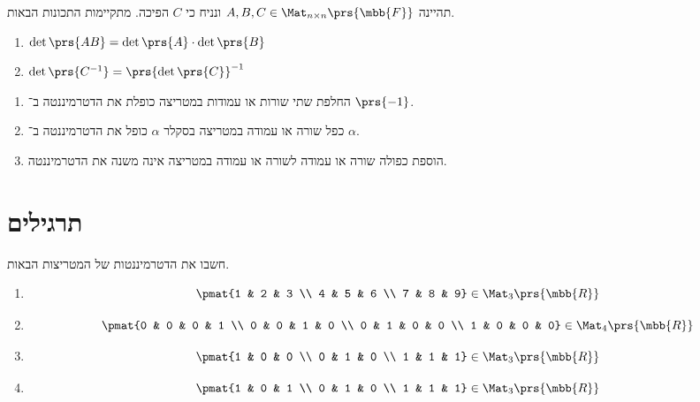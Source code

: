 \documentclass[a4paper,10pt,twoside,openany]{book}
\begin{document}
\begin{theorem}
תהיינה
$A, B, C \in \Mat_{n \times n}\prs{\mbb{F}}$
ונניח כי
$C$
הפיכה.
מתקיימות התכונות הבאות.
\begin{enumerate}
\item $\det\prs{AB} = \det\prs{A} \cdot \det\prs{B}$
\item $\det\prs{C^{-1}} = \prs{\det\prs{C}}^{-1}$
\end{enumerate}
\end{theorem}

\begin{theorem}
\begin{enumerate}
\item החלפת שתי שורות או עמודות במטריצה כופלת את הדטרמיננטה ב־%
$\prs{-1}$.
\item כפל שורה או עמודה במטריצה בסקלר
$\alpha$
כופל את הדטרמיננטה ב־%
$\alpha$.
\item הוספת כפולה שורה או עמודה לשורה או עמודה במטריצה אינה משנה את הדטרמיננטה.
\end{enumerate}
\end{theorem}

\section{תרגילים}

\begin{exercisechap}
חשבו את הדטרמיננטות של המטריצות הבאות.

\begin{enumerate}
\item \[\pmat{1 & 2 & 3 \\ 4 & 5 & 6 \\ 7 & 8 & 9} \in \Mat_{3}\prs{\mbb{R}}\]
\item \[\pmat{0 & 0 & 0 & 1 \\ 0 & 0 & 1 & 0 \\ 0 & 1 & 0 & 0 \\ 1 & 0 & 0 & 0} \in \Mat_{4}\prs{\mbb{R}}\]
\item \[\pmat{1 & 0 & 0 \\ 0 & 1 & 0 \\ 1 & 1 & 1} \in \Mat_{3}\prs{\mbb{R}}\]
\item \[\pmat{1 & 0 & 1 \\ 0 & 1 & 0 \\ 1 & 1 & 1} \in \Mat_{3}\prs{\mbb{R}}\]
\end{enumerate}
\end{exercisechap}
\end{document}
